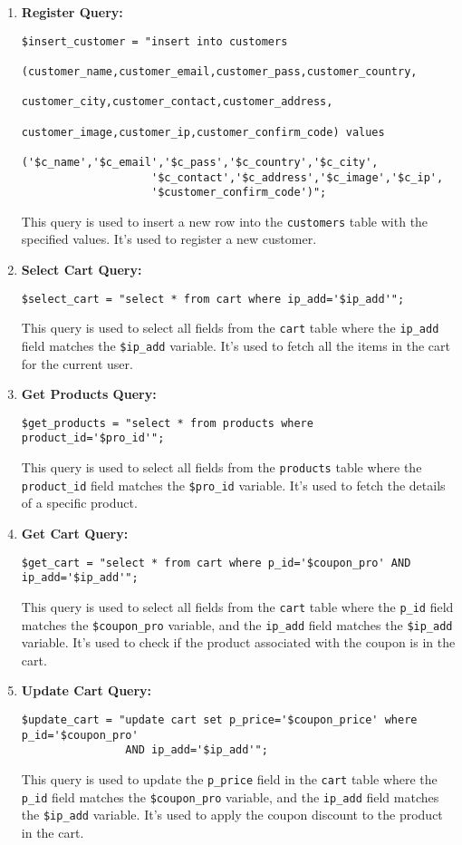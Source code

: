 \documentclass{article}
\begin{document}
\begin{enumerate}
    \item \textbf{Register Query:}
    \begin{verbatim}
$insert_customer = "insert into customers                                       
                    (customer_name,customer_email,customer_pass,customer_country,
                    customer_city,customer_contact,customer_address,
                    customer_image,customer_ip,customer_confirm_code) values 
                    ('$c_name','$c_email','$c_pass','$c_country','$c_city',
                    '$c_contact','$c_address','$c_image','$c_ip',
                    '$customer_confirm_code')";
    \end{verbatim}
    This query is used to insert a new row into the \texttt{customers} table with the specified values. It's used to register a new customer.

    \item \textbf{Select Cart Query:}
    \begin{verbatim}
$select_cart = "select * from cart where ip_add='$ip_add'";
    \end{verbatim}
    This query is used to select all fields from the \texttt{cart} table where the \texttt{ip\_add} field matches the \texttt{\$ip\_add} variable. It's used to fetch all the items in the cart for the current user.
    
    \item \textbf{Get Products Query:}
    \begin{verbatim}
$get_products = "select * from products where product_id='$pro_id'";
    \end{verbatim}
    This query is used to select all fields from the \texttt{products} table where the \texttt{product\_id} field matches the \texttt{\$pro\_id} variable. It's used to fetch the details of a specific product.
    
    \item \textbf{Get Cart Query:}
    \begin{verbatim}
$get_cart = "select * from cart where p_id='$coupon_pro' AND ip_add='$ip_add'";
    \end{verbatim}
    This query is used to select all fields from the \texttt{cart} table where the \texttt{p\_id} field matches the \texttt{\$coupon\_pro} variable, and the \texttt{ip\_add} field matches the \texttt{\$ip\_add} variable. It's used to check if the product associated with the coupon is in the cart.
    
    \item \textbf{Update Cart Query:}
    \begin{verbatim}
$update_cart = "update cart set p_price='$coupon_price' where p_id='$coupon_pro' 
                AND ip_add='$ip_add'";
    \end{verbatim}
    This query is used to update the \texttt{p\_price} field in the \texttt{cart} table where the \texttt{p\_id} field matches the \texttt{\$coupon\_pro} variable, and the \texttt{ip\_add} field matches the \texttt{\$ip\_add} variable. It's used to apply the coupon discount to the product in the cart.
    

\end{enumerate}
\end{document}
